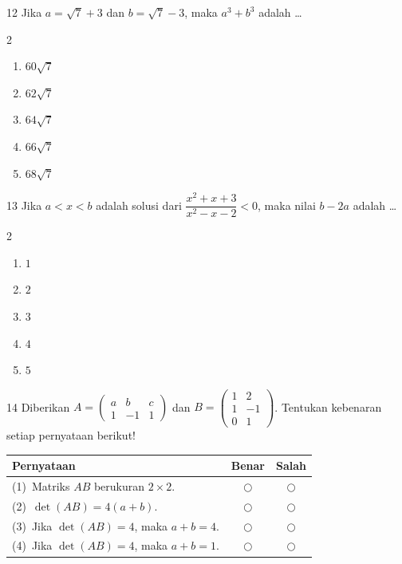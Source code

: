 \documentclass[11pt]{article}
\newenvironment{pilB}{%
  \par\smallskip\begin{multicols}{2}
  \begin{enumerate}[label=(\Alph*),leftmargin=*,itemsep=1pt,topsep=3pt]}%
  {\end{enumerate}\end{multicols}}
\begin{document}
\begin{soal}{12}
Jika $a=\sqrt{7}+3$ dan $b=\sqrt{7}-3$, maka $a^3+b^3$ adalah \ldots
\begin{pilB}
  \item $60\sqrt{7}$ \item $62\sqrt{7}$ \item $64\sqrt{7}$
  \item $66\sqrt{7}$ \item $68\sqrt{7}$
\end{pilB}
\end{soal}

\begin{soal}{13}
Jika $a<x<b$ adalah solusi dari $\dfrac{x^2+x+3}{x^2-x-2}<0$,
maka nilai $b-2a$ adalah \ldots
\begin{pilB}
  \item $1$ \item $2$ \item $3$ \item $4$ \item $5$
\end{pilB}
\end{soal}

\begin{soal}{14}
Diberikan $A=\begin{pmatrix} a & b & c\\ 1 & -1 & 1\end{pmatrix}$
dan $B=\begin{pmatrix} 1 & 2\\ 1 & -1\\ 0 & 1\end{pmatrix}$.
Tentukan kebenaran setiap pernyataan berikut!

\par\smallskip
{\renewcommand{\arraystretch}{1.4}%
\begin{tabular}{@{}p{0.76\linewidth}cc@{}}
\hline
\textbf{Pernyataan} & \textbf{Benar} & \textbf{Salah}\\
\hline
(1)~Matriks $AB$ berukuran $2\times2$.
  & $\bigcirc$ & $\bigcirc$\\
(2)~$\det(AB) = 4(a+b)$.
  & $\bigcirc$ & $\bigcirc$\\
(3)~Jika $\det(AB)=4$, maka $a+b=4$.
  & $\bigcirc$ & $\bigcirc$\\
(4)~Jika $\det(AB)=4$, maka $a+b=1$.
  & $\bigcirc$ & $\bigcirc$\\
\hline
\end{tabular}}
\end{soal}
\end{document}
